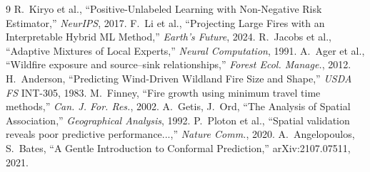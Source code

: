 \documentclass[10pt,twocolumn,a4paper]{article}
\begin{document}
\begin{thebibliography}{9}\small
{} R.~Kiryo et al., ``Positive-Unlabeled Learning with Non-Negative Risk Estimator,'' \emph{NeurIPS}, 2017.
 F.~Li et al., ``Projecting Large Fires with an Interpretable Hybrid ML Method,'' \emph{Earth's Future}, 2024.
 R.~Jacobs et al., ``Adaptive Mixtures of Local Experts,'' \emph{Neural Computation}, 1991.
 A.~Ager et al., ``Wildfire exposure and source--sink relationships,'' \emph{Forest Ecol. Manage.}, 2012.
 H.~Anderson, ``Predicting Wind-Driven Wildland Fire Size and Shape,'' \emph{USDA FS} INT-305, 1983.
 M.~Finney, ``Fire growth using minimum travel time methods,'' \emph{Can. J. For. Res.}, 2002.
 A.~Getis, J.~Ord, ``The Analysis of Spatial Association,'' \emph{Geographical Analysis}, 1992.
 P.~Ploton et al., ``Spatial validation reveals poor predictive performance...,'' \emph{Nature Comm.}, 2020.
 A.~Angelopoulos, S.~Bates, ``A Gentle Introduction to Conformal Prediction,'' arXiv:2107.07511, 2021.
\end{thebibliography}
\end{document}
